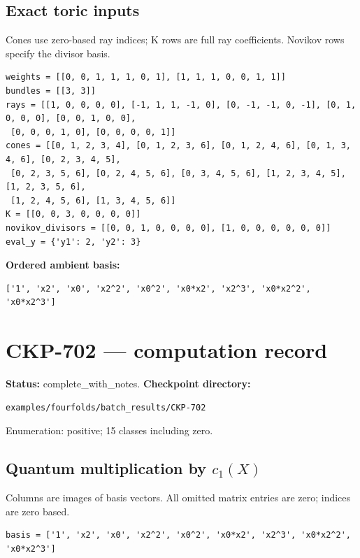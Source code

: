 \documentclass[10pt,a4paper]{article}
\begin{document}
\subsection*{Exact toric inputs}
Cones use zero-based ray indices; K rows are full ray coefficients. Novikov rows specify the divisor basis.

\begin{lstlisting}
weights = [[0, 0, 1, 1, 1, 0, 1], [1, 1, 1, 0, 0, 1, 1]]
bundles = [[3, 3]]
rays = [[1, 0, 0, 0, 0], [-1, 1, 1, -1, 0], [0, -1, -1, 0, -1], [0, 1, 0, 0, 0], [0, 0, 1, 0, 0],
 [0, 0, 0, 1, 0], [0, 0, 0, 0, 1]]
cones = [[0, 1, 2, 3, 4], [0, 1, 2, 3, 6], [0, 1, 2, 4, 6], [0, 1, 3, 4, 6], [0, 2, 3, 4, 5],
 [0, 2, 3, 5, 6], [0, 2, 4, 5, 6], [0, 3, 4, 5, 6], [1, 2, 3, 4, 5], [1, 2, 3, 5, 6],
 [1, 2, 4, 5, 6], [1, 3, 4, 5, 6]]
K = [[0, 0, 3, 0, 0, 0, 0]]
novikov_divisors = [[0, 0, 1, 0, 0, 0, 0], [1, 0, 0, 0, 0, 0, 0]]
eval_y = {'y1': 2, 'y2': 3}
\end{lstlisting}

\textbf{Ordered ambient basis:}
\begin{lstlisting}
['1', 'x2', 'x0', 'x2^2', 'x0^2', 'x0*x2', 'x2^3', 'x0*x2^2', 'x0*x2^3']
\end{lstlisting}

\clearpage\section*{CKP-702 --- computation record}
\textbf{Status:} complete\_with\_notes.
\textbf{Checkpoint directory:}
\begin{lstlisting}
examples/fourfolds/batch_results/CKP-702
\end{lstlisting}

Enumeration: positive; 15 classes including zero.
\subsection*{Quantum multiplication by $c_1(X)$}
Columns are images of basis vectors. All omitted matrix entries are zero; indices are zero based.

\begin{lstlisting}
basis = ['1', 'x2', 'x0', 'x2^2', 'x0^2', 'x0*x2', 'x2^3', 'x0*x2^2', 'x0*x2^3']
\end{lstlisting}
\end{document}
